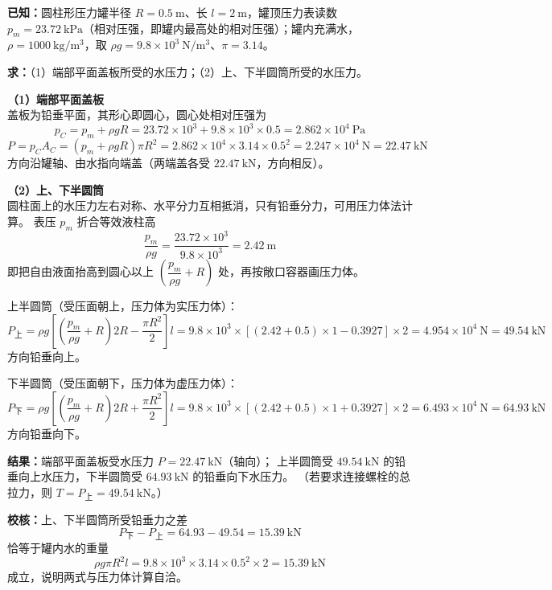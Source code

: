 
\begin{jie}
\textbf{已知：}圆柱形压力罐半径 $R=0.5\ \mathrm{m}$、长 $l=2\ \mathrm{m}$，罐顶压力表读数
$p_m=23.72\ \mathrm{kPa}$（相对压强，即罐内最高处的相对压强）；罐内充满水，
$\rho=1000\ \mathrm{kg/m^3}$，取 $\rho g=9.8\times10^{3}\ \mathrm{N/m^3}$、$\pi=3.14$。

\textbf{求：}（1）端部平面盖板所受的水压力；（2）上、下半圆筒所受的水压力。

\textbf{（1）端部平面盖板}\\
盖板为铅垂平面，其形心即圆心，圆心处相对压强为
\[
p_C=p_m+\rho gR=23.72\times10^{3}+9.8\times10^{3}\times0.5=2.862\times10^{4}\ \mathrm{Pa}
\]
\[
P=p_CA_C=(p_m+\rho gR)\pi R^{2}=2.862\times10^{4}\times3.14\times0.5^{2}=2.247\times10^{4}\ \mathrm{N}=22.47\ \mathrm{kN}
\]
方向沿罐轴、由水指向端盖（两端盖各受 $22.47\ \mathrm{kN}$，方向相反）。

\textbf{（2）上、下半圆筒}\\
圆柱面上的水压力左右对称、水平分力互相抵消，只有铅垂分力，可用压力体法计算。
表压 $p_m$ 折合等效液柱高
\[
\frac{p_m}{\rho g}=\frac{23.72\times10^{3}}{9.8\times10^{3}}=2.42\ \mathrm{m}
\]
即把自由液面抬高到圆心以上 $\left(\dfrac{p_m}{\rho g}+R\right)$ 处，再按敞口容器画压力体。

上半圆筒（受压面朝上，压力体为实压力体）：
\[
P_{\text{上}}=\rho g\left[\left(\frac{p_m}{\rho g}+R\right)2R-\frac{\pi R^{2}}{2}\right]l
=9.8\times10^{3}\times\left[(2.42+0.5)\times1-0.3927\right]\times2=4.954\times10^{4}\ \mathrm{N}=49.54\ \mathrm{kN}
\]
方向铅垂向上。

下半圆筒（受压面朝下，压力体为虚压力体）：
\[
P_{\text{下}}=\rho g\left[\left(\frac{p_m}{\rho g}+R\right)2R+\frac{\pi R^{2}}{2}\right]l
=9.8\times10^{3}\times\left[(2.42+0.5)\times1+0.3927\right]\times2=6.493\times10^{4}\ \mathrm{N}=64.93\ \mathrm{kN}
\]
方向铅垂向下。

\textbf{结果：}端部平面盖板受水压力 $P=22.47\ \mathrm{kN}$（轴向）；
上半圆筒受 $49.54\ \mathrm{kN}$ 的铅垂向上水压力，下半圆筒受 $64.93\ \mathrm{kN}$ 的铅垂向下水压力。
（若要求连接螺栓的总拉力，则 $T=P_{\text{上}}=49.54\ \mathrm{kN}$。）

\textbf{校核：}上、下半圆筒所受铅垂力之差
\[
P_{\text{下}}-P_{\text{上}}=64.93-49.54=15.39\ \mathrm{kN}
\]
恰等于罐内水的重量
\[
\rho g\pi R^{2}l=9.8\times10^{3}\times3.14\times0.5^{2}\times2=15.39\ \mathrm{kN}
\]
成立，说明两式与压力体计算自洽。
\end{jie}

